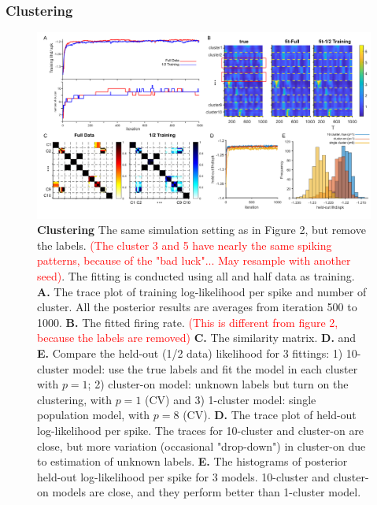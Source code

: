 \documentclass{article}
\begin{document}
%	
%		
%		
	
	\subsubsection{Clustering}
	
	\begin{figure}[h!]
		\centering
		\includegraphics[width=1\textwidth]{figure3.jpg}
		\caption{\textbf{Clustering} The same simulation setting as in Figure 2, but remove the labels. \textcolor{red}{(The cluster 3 and 5 have nearly the same spiking patterns, because of the "bad luck"... May resample with another seed)}. The fitting is conducted using all and half data as training. \textbf{A.} The trace plot of training log-likelihood per spike and number of cluster. All the posterior results are averages from iteration 500 to 1000. \textbf{B.} The fitted firing rate. \textcolor{red}{(This is different from figure 2, because the labels are removed)} \textbf{C.} The similarity matrix. \textbf{D.} and \textbf{E.} Compare the held-out (1/2 data) likelihood for 3 fittings: 1) 10-cluster model: use the true labels and fit the model in each cluster with $p=1$; 2) cluster-on model: unknown labels but turn on the clustering, with $p=1$ (CV) and 3) 1-cluster model: single population model, with $p=8$ (CV). \textbf{D.} The trace plot of held-out log-likelihood per spike. The traces for 10-cluster and cluster-on are close, but more variation (occasional "drop-down") in cluster-on due to estimation of unknown labels. \textbf{E.} The histograms of posterior held-out log-likelihood per spike for 3 models. 10-cluster and cluster-on models are close, and they perform better than 1-cluster model.}
	\end{figure}
	
\end{document}
